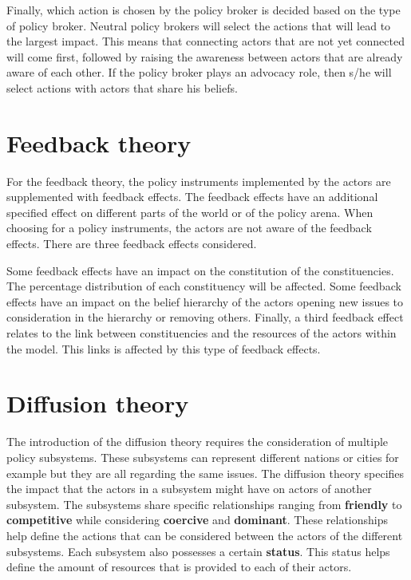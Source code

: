 Finally, which action is chosen by the policy broker is decided based on the type of policy broker. Neutral policy brokers will select the actions that will lead to the largest impact. This means that connecting actors that are not yet connected will come first, followed by raising the awareness between actors that are already aware of each other. If the policy broker plays an advocacy role, then s/he will select actions with actors that share his beliefs.

\section{Feedback theory}
\label{sec:conceptualisationFeedbackRevised}

For the feedback theory, the policy instruments implemented by the actors are supplemented with feedback effects. The feedback effects have an additional specified effect on different parts of the world or of the policy arena. When choosing for a policy instruments, the actors are not aware of the feedback effects. There are three feedback effects considered.

Some feedback effects have an impact on the constitution of the constituencies. The percentage distribution of each constituency will be affected. Some feedback effects have an impact on the belief hierarchy of the actors opening new issues to consideration in the hierarchy or removing others. Finally, a third feedback effect relates to the link between constituencies and the resources of the actors within the model. This links is affected by this type of feedback effects.

\section{Diffusion theory}
\label{sec:conceptualisationDiffusionRevised}

The introduction of the diffusion theory requires the consideration of multiple policy subsystems. These subsystems can represent different nations or cities for example but they are all regarding the same issues. The diffusion theory specifies the impact that the actors in a subsystem might have on actors of another subsystem. The subsystems share specific relationships ranging from {\bfseries friendly} to {\bfseries competitive} while considering {\bfseries coercive} and {\bfseries dominant}. These relationships help define the actions that can be considered between the actors of the different subsystems. Each subsystem also possesses a certain {\bfseries status}. This status helps define the amount of resources that is provided to each of their actors.

